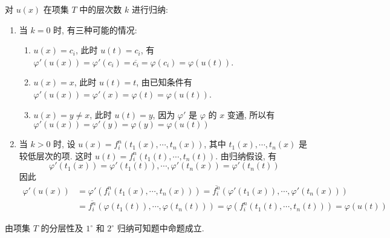 \documentclass[boxes]{homework}
\begin{document}
\begin{solution}
    对 $u(x)$ 在项集 $T$ 中的层次数 $k$ 进行归纳:
    \begin{enumerate}[label = $\arabic*^\circ$, itemsep = 0em, topsep = .5em, partopsep = .5em]
        \item 当 $k=0$ 时, 有三种可能的情况:
              \begin{enumerate}[label = \arabic*), itemsep = 0em, topsep = .5em, partopsep = .5em]
                  \item $u(x) = c_i$, 此时 $u(t) = c_i$, 有 $\varphi'(u(x)) = \varphi'(c_i) = \overline{c_i} = \varphi(c_i) = \varphi(u(t))$.
                  \item $u(x) = x$, 此时 $u(t) = t$, 由已知条件有 $\varphi'(u(x)) = \varphi'(x) = \varphi(t) = \varphi(u(t))$.
                  \item $u(x) = y \neq x$, 此时 $u(t) = y$, 因为 $\varphi'$ 是 $\varphi$ 的 $x$ 变通, 所以有 $\varphi'(u(x)) = \varphi'(y) = \varphi(y) = \varphi(u(t))$
              \end{enumerate}
        \item 当 $k > 0$ 时, 设 $u(x) = f_i^n(t_1(x), \cdots, t_n(x))$, 其中 $t_1(x), \cdots, t_n(x)$ 是较低层次的项. 这时 $u(t) = f_i^n(t_1(t), \cdots, t_n(t))$. 由归纳假设, 有
              $$
                  \varphi'(t_1(x)) = \varphi'(t_1(t)), \cdots, \varphi'(t_n(x)) = \varphi'(t_n(t))
              $$
              因此
              \begin{align*}
                  \varphi'(u(x)) & = \varphi'(f_i^n(t_1(x), \cdots, t_n(x))) = \overline{f_i^n}(\varphi'(t_1(x)), \cdots, \varphi'(t_n(x)))              \\
                                 & = \overline{f_i^n}(\varphi(t_1(t)), \cdots, \varphi(t_n(t))) = \varphi(f_i^n(t_1(t), \cdots, t_n(t))) = \varphi(u(t))
              \end{align*}
    \end{enumerate}
    由项集 $T$ 的分层性及 $1^\circ$ 和 $2^\circ$ 归纳可知题中命题成立.
\end{solution}
\end{document}
